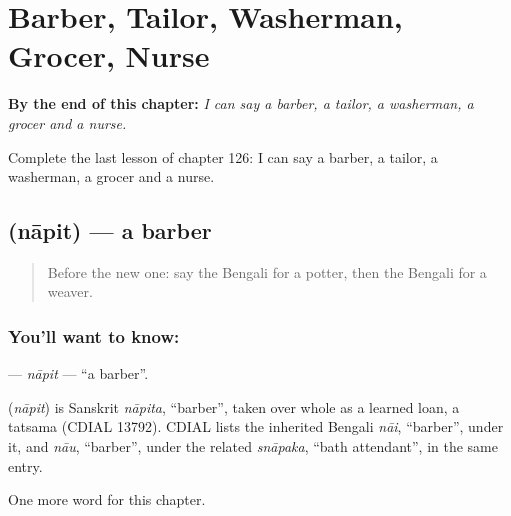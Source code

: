 
\chapter{Barber, Tailor, Washerman, Grocer, Nurse}
\label{ch:bn-barber-tailor-washerman-grocer-nurse}

\begin{chapteropening}
\textbf{By the end of this chapter:} \emph{I can say a barber, a tailor, a washerman, a grocer and a nurse.}

Complete the last lesson of chapter 126: I can say a barber, a tailor, a washerman, a grocer and a nurse.
\end{chapteropening}

\section[\texorpdfstring{\bn{নাপিত} (nāpit)}{নাপিত (nāpit)}]{ (nāpit) — a barber}

\label{lesson:BN-C126-napit}



\begin{quote}
Before the new one: say the Bengali for a potter, then the Bengali for a weaver.
\end{quote}

\subsection*{You'll want to know: }
\textbf{} — \emph{nāpit} — \textquotedblleft{}a barber\textquotedblright{}.

\begin{cousinweb}
\textbf{} (\emph{nāpit}) is Sanskrit \emph{nāpita}, \textquotedblleft{}barber\textquotedblright{}, taken over whole as a learned loan, a tatsama (CDIAL 13792). CDIAL lists the inherited Bengali \emph{nāi}, \textquotedblleft{}barber\textquotedblright{}, under it, and \emph{nāu}, \textquotedblleft{}barber\textquotedblright{}, under the related \emph{snāpaka}, \textquotedblleft{}bath attendant\textquotedblright{}, in the same entry.
\end{cousinweb}

\begin{grammarlens}[title={What you've built}]
One more word for this chapter.
\end{grammarlens}


